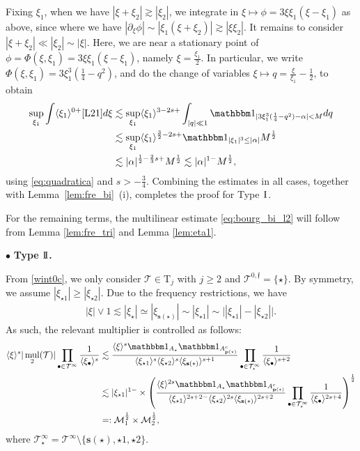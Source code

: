 \documentclass[%
11pt,  reqno]{amsart}
\newcommand{\I}{\hspace{0.2mm}\textup{I}\hspace{0.2mm}}
\newcommand{\II}{\textup{I \hspace{-2.9mm} I} }
\newcommand{\5}{\textup{V}}
\newcommand{\noi}{\noindent}
\newcommand{\ind}{\mathbbm 1}
\newcommand{\les}{\lesssim}
\theoremstyle{remark}
\newcommand{\bul}{\bullet}
\newcommand{\TT}{\mathcal{T}}
\newcommand{\Tr}{\mathrm{T}}
\newcommand{\al}{\alpha}
\newcommand{\pb}{\mathbf{p}}
\newcommand{\sbf}{\mathbf{s}}
\newcommand{\ges}{\gtrsim}
\newcommand{\jb}[1]
{\langle #1 \rangle}
\newcommand{\ff}{\mathfrak{f}}
\newcommand{\M}{\mathcal{M}}
\DeclareMathOperator{\mul}{mul}
\numberwithin{equation}{section}
\numberwithin{theorem}{section}
\begin{document}
Fixing $\xi_1$, when we have $|\xi+\xi_2| \ges |\xi_2|$, we integrate in $\xi \mapsto \phi = 3 \xi \xi_1 (\xi-\xi_1)$ as above, since
where we have $|\partial_\xi \phi | \sim |\xi_1 (\xi + \xi_2)| \ges |\xi \xi_2|$. 
It remains to consider $|\xi + \xi_2| \ll |\xi_2| \sim |\xi|$. Here, we are near a stationary point of $\phi = \Phi(\xi,\xi_1) = 3 \xi \xi_1 (\xi-\xi_1)$, namely $\xi = \frac{\xi_1}{2}$. In particular, we write $\Phi(\xi, \xi_1) =3  \xi_1^3 (\frac14 - q^2)$, and do the change of variables $\xi \mapsto q = \frac{\xi}{\xi_1} - \frac12$, to obtain 
\begin{align}
\sup_{\xi_1} \int \jb{\xi_1}^{0+} \eqref{L21} d\xi 
&
\les 
\sup_{\xi_1} \jb{\xi_1}^{3-2s + }  \int_{|q| \ll 1} \ind_{| 3 \xi_1^3 (\frac14 - q^2) - \al| < M } d q
\\
&
\les 
\sup_{\xi_1} \jb{\xi_1}^{\frac32 -2s + } \ind_{|\xi_1|^3 \le |\al|} M^\frac12
\\
&
\les 
|\al|^{\frac12 - \frac23 s +} M^\frac12
\les |\al|^{1-} M^{\frac12}, 
\end{align}
using  \eqref{eq:quadratica} and   $s>-\frac34$.
Combining the estimates in all cases, together with Lemma~\ref{lem:fre_bi}~(i), completes the proof for Type $\I$.



\medskip

For the remaining terms, the multilinear estimate \eqref{eq:bourg_bi_l2} will follow from Lemma \ref{lem:fre_tri} and Lemma \ref{lem:eta1}.

\medskip

\noi
$\bul$ \textbf{Type $\II$.}


From \eqref{wint0c}, we only consider $\TT\in \Tr_j$ with $j\ge 2$ and $\TT^{0,\ff} = \{\star\}$. 
By symmetry, we assume $|\xi_{\star1}| \ge |\xi_{\star2}|$. Due to the frequency restrictions, we have
\begin{align}
|\xi| \lor 1 
 \les |\xi_{\star}| \simeq |\xi_{\sbf(\star)}| 
\sim 
|\xi_{\star1}| 
\sim 
\big| |\xi_{\star1} | - |\xi_{\star2}| \big| 
.
\end{align}
As such, the relevant multiplier is controlled as follows:
\begin{align}\label{L22}
\jb{\xi}^s |\mul_2(\TT)|  \prod_{\bul \in \TT^\infty} \frac{1}{\jb{\xi_\bul}^s}
&
\les \frac{\jb{\xi}^s \ind_{A_\star} \ind_{A^c_{\pb(\star)}} }{ \jb{\xi_{\star1}}^s \jb{\xi_{\star2}}^s  \jb{\xi_{\sbf(\star)}}^{s+1} } \prod_{\bul \in \TT^{\infty}_\star} \frac{1}{\jb{\xi_{\bul}}^{s+2}}
\\ 
& 
\lesssim 
|\xi_{\star1}|^{1-}
\times 
\left(\frac{\jb{\xi}^{2s} \ind_{A_\star} \ind_{A^c_{\pb(\star)}} }{ \jb{\xi_{\star1}}^{2s+2-} \jb{\xi_{\star2}}^{2s}  \jb{\xi_{\sbf(\star)}}^{2s+2} } \prod_{\bul \in \TT^{\infty}_\star} \frac{1}{\jb{\xi_{\bul}}^{2s+4}}\right)^{\frac12}
\\
&
=:\mathcal{M}_1^{\frac12}
\times 
\M_2^\frac12
, 
\end{align}
where $\TT^\infty_\star = \TT^\infty \setminus \{\sbf(\star), \star1, \star2\}$. 
\end{document}
